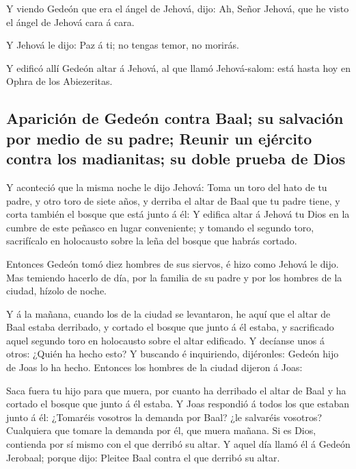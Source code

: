  Y viendo Gedeón que era el ángel de Jehová, dijo: Ah,
Señor Jehová, que he visto el ángel de Jehová cara á cara.

 Y Jehová le dijo: Paz á ti; no tengas temor, no morirás.

 Y edificó allí Gedeón altar á Jehová, al que llamó
Jehová-salom: está hasta hoy en Ophra de los Abiezeritas.

\hypertarget{apariciuxf3n-de-gedeuxf3n-contra-baal-su-salvaciuxf3n-por-medio-de-su-padre-reunir-un-ejuxe9rcito-contra-los-madianitas-su-doble-prueba-de-dios}{%
\subsection{Aparición de Gedeón contra Baal; su salvación por medio de
su padre; Reunir un ejército contra los madianitas; su doble prueba de
Dios}\label{apariciuxf3n-de-gedeuxf3n-contra-baal-su-salvaciuxf3n-por-medio-de-su-padre-reunir-un-ejuxe9rcito-contra-los-madianitas-su-doble-prueba-de-dios}}

 Y aconteció que la misma noche le dijo Jehová: Toma un
toro del hato de tu padre, y otro toro de siete años, y derriba el altar
de Baal que tu padre tiene, y corta también el bosque que está junto á
él:  Y edifica altar á Jehová tu Dios en la cumbre de este
peñasco en lugar conveniente; y tomando el segundo toro, sacrifícalo en
holocausto sobre la leña del bosque que habrás cortado.

 Entonces Gedeón tomó diez hombres de sus siervos, é hizo
como Jehová le dijo. Mas temiendo hacerlo de día, por la familia de su
padre y por los hombres de la ciudad, hízolo de noche.

 Y á la mañana, cuando los de la ciudad se levantaron, he
aquí que el altar de Baal estaba derribado, y cortado el bosque que
junto á él estaba, y sacrificado aquel segundo toro en holocausto sobre
el altar edificado.  Y decíanse unos á otros: ¿Quién ha
hecho esto? Y buscando é inquiriendo, dijéronles: Gedeón hijo de Joas lo
ha hecho. Entonces los hombres de la ciudad dijeron á Joas:

 Saca fuera tu hijo para que muera, por cuanto ha derribado
el altar de Baal y ha cortado el bosque que junto á él estaba.
 Y Joas respondió á todos los que estaban junto á él:
¿Tomaréis vosotros la demanda por Baal? ¿le salvaréis vosotros?
Cualquiera que tomare la demanda por él, que muera mañana. Si es Dios,
contienda por sí mismo con el que derribó su altar.  Y
aquel día llamó él á Gedeón Jerobaal; porque dijo: Pleitee Baal contra
el que derribó su altar.

